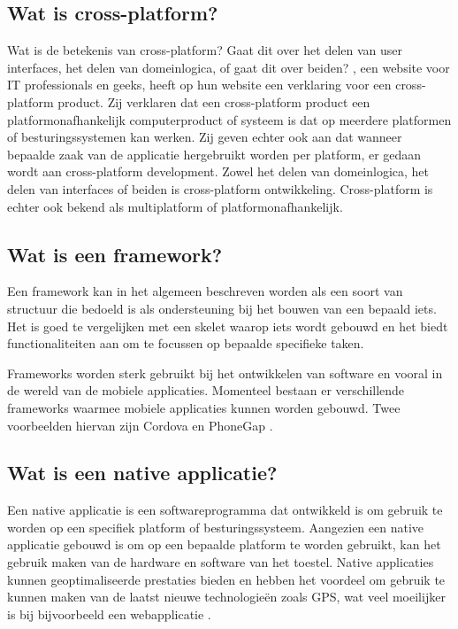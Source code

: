  \subsection{Wat is cross-platform?}
 Wat is de betekenis van cross-platform? Gaat dit over het delen van user interfaces, het delen van domeinlogica, of gaat dit over beiden? \textcite{CrossExplain}, een website voor IT professionals en geeks, heeft op hun website een verklaring voor een cross-platform product. Zij verklaren dat een cross-platform product een platformonafhankelijk computerproduct of systeem is dat op meerdere platformen of besturingssystemen kan werken. Zij geven echter ook aan dat wanneer bepaalde zaak van de applicatie hergebruikt worden per platform, er gedaan wordt aan cross-platform development. Zowel het delen van domeinlogica, het delen van interfaces of beiden is cross-platform ontwikkeling. Cross-platform is echter ook bekend als multiplatform of platformonafhankelijk.
 
\subsection{Wat is een framework?}
Een framework kan in het algemeen beschreven worden als een soort van structuur die bedoeld is als ondersteuning bij het bouwen van een bepaald iets. Het is goed te vergelijken met een skelet waarop iets wordt gebouwd en het biedt functionaliteiten aan om te focussen op bepaalde specifieke taken. 

Frameworks worden sterk gebruikt bij het ontwikkelen van software en vooral in de wereld van de mobiele applicaties. Momenteel bestaan er verschillende frameworks waarmee mobiele applicaties kunnen worden gebouwd. Twee voorbeelden hiervan zijn Cordova en PhoneGap \autocite{Framework}.

\subsection{Wat is een native applicatie?}
Een native applicatie is een softwareprogramma dat ontwikkeld is om gebruik te worden op een specifiek platform of besturingssysteem. Aangezien een native applicatie gebouwd is om op een bepaalde platform te worden gebruikt, kan het gebruik maken van de hardware en software van het toestel. Native applicaties kunnen geoptimaliseerde prestaties bieden en hebben het voordeel om gebruik te kunnen maken van de laatst nieuwe technologieën zoals GPS, wat veel moeilijker is bij bijvoorbeeld een webapplicatie \autocite{MeaningNativeApp}.

